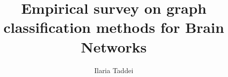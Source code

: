 \documentclass[english, Lau, oneside]{sapthesis}%
\title{Empirical survey on graph classification methods for Brain Networks}
\author{Ilaria Taddei}
\begin{document}
	\frontmatter
	\maketitle
	
	\tableofcontents
	
	\mainmatter
	
	
	 
	
	
	\backmatter
	
	
	\clearpage
	
	
\end{document}
